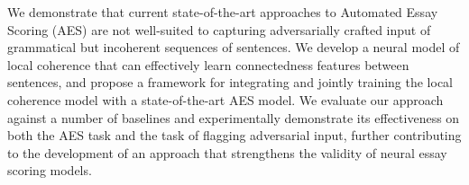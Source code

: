 We demonstrate that current state-of-the-art approaches to Automated Essay Scoring (AES) are not well-suited to capturing adversarially crafted input of grammatical but incoherent sequences of sentences. We develop a neural model of local coherence that can effectively learn connectedness features between sentences, and propose a framework for integrating and jointly training the local coherence model with a state-of-the-art AES model. We evaluate our approach against a number of baselines and experimentally demonstrate its effectiveness on both the AES task and the task of flagging adversarial input, further contributing to the development of an approach that strengthens the validity of neural essay scoring models.
